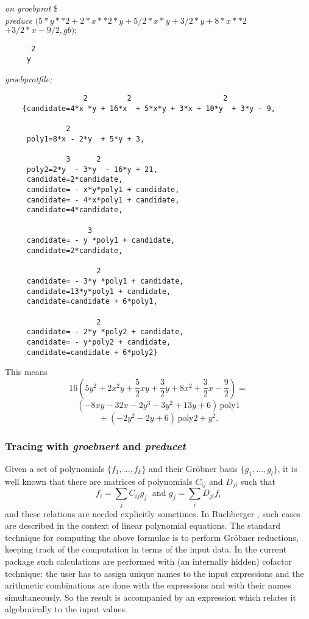 \example {}

{\it on groebprot} \$ \\
{\it preduce} $ (5*y**2 + 2*x**2*y + 5/2*x*y + 3/2*y + 8*x**2 $ \\
\hspace*{+1cm} $+ 3/2*x - 9/2, gb);$
\begin{verbatim}
      2
     y
\end{verbatim}
{\it groebprotfile;}
\begin{verbatim}
                  2         2                     2
    {candidate=4*x *y + 16*x  + 5*x*y + 3*x + 10*y  + 3*y - 9,

              2
     poly1=8*x - 2*y  + 5*y + 3,

              3      2
     poly2=2*y  - 3*y  - 16*y + 21,
     candidate=2*candidate,
     candidate= - x*y*poly1 + candidate,
     candidate= - 4*x*poly1 + candidate,
     candidate=4*candidate,

                   3
     candidate= - y *poly1 + candidate,
     candidate=2*candidate,

                     2
     candidate= - 3*y *poly1 + candidate,
     candidate=13*y*poly1 + candidate,
     candidate=candidate + 6*poly1,

                     2
     candidate= - 2*y *poly2 + candidate,
     candidate= - y*poly2 + candidate,
     candidate=candidate + 6*poly2}
\end{verbatim}
This means
\[
16 (5 y^2 + 2 x^2 y + \frac{5}{2} x y + \frac{3}{2} y
+ 8 x^2+ \frac{3}{2} x - \frac{9}{2})=
\]
\[
(-8 x y -32 x -2 y^3 -3 y^2 + 13 y + 6)\,\mbox{poly1}
\]
\[
\mbox{} + (-2 y^2 -2 y + 6)\,\mbox{poly2} + y^2.
\]

\subsubsection{Tracing with \emph{groebnert} and \emph{preducet}}
Given a set of polynomials $\{f_1,\ldots ,f_k\}$ and their Gr\"obner
basis $\{g_1,\ldots ,g_l\}$, it is well known that there are matrices of
polynomials $C_{ij}$ and $D_{ji}$ such that
\[
f_i = \displaystyle{\sum\limits_j} C_{ij} g_j \;\mbox{  and  } g_j =
\displaystyle{\sum\limits_i} D_{ji} f_i
\]
and these relations are needed explicitly sometimes.
In {\sc Buchberger} \cite{Buchberger:85}, such cases are described in the
context of linear polynomial equations. The standard technique for
computing the above formulae is to perform
Gr\"obner reductions, keeping track of the
computation in terms of the input data. In the current package such
calculations are performed with (an internally hidden) cofactor
technique: the user has to assign unique names to the input
expressions and the  arithmetic combinations are done with the
expressions and with their names simultaneously. So the result is
accompanied by an expression which relates it algebraically to the
input values.

